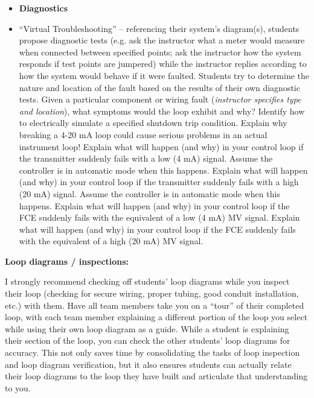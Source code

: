 \begin{itemize}
\item{} {\bf Diagnostics}
\item{} ``Virtual Troubleshooting'' -- referencing their system's diagram(s), students propose diagnostic tests (e.g. ask the instructor what a meter would measure when connected between specified points; ask the instructor how the system responds if test points are jumpered) while the instructor replies according to how the system would behave if it were faulted.  Students try to determine the nature and location of the fault based on the results of their own diagnostic tests.
\itemitem{} Given a particular component or wiring fault ({\it instructor specifies type and location}), what symptoms would the loop exhibit and why?
\itemitem{} Identify how to electrically simulate a specified shutdown trip condition.
\itemitem{} Explain why breaking a 4-20 mA loop could cause serious problems in an actual instrument loop!
\itemitem{} Explain what will happen (and why) in your control loop if the transmitter suddenly fails with a low (4 mA) signal.  Assume the controller is in automatic mode when this happens.
\itemitem{} Explain what will happen (and why) in your control loop if the transmitter suddenly fails with a high (20 mA) signal.  Assume the controller is in automatic mode when this happens.
\itemitem{} Explain what will happen (and why) in your control loop if the FCE suddenly fails with the equivalent of a low (4 mA) MV signal.
\itemitem{} Explain what will happen (and why) in your control loop if the FCE suddenly fails with the equivalent of a high (20 mA) MV signal.
\end{itemize}















\noindent
{\bf Loop diagrams / inspections:}

I strongly recommend checking off students' loop diagrams while you inspect their loop (checking for secure wiring, proper tubing, good conduit installation, etc.) with them.  Have all team members take you on a ``tour'' of their completed loop, with each team member explaining a different portion of the loop you select while using their own loop diagram as a guide.  While a student is explaining their section of the loop, you can check the other students' loop diagrams for accuracy.  This not only saves time by consolidating the tasks of loop inspection and loop diagram verification, but it also ensures students can actually relate their loop diagrams to the loop they have built and articulate that understanding to you.




